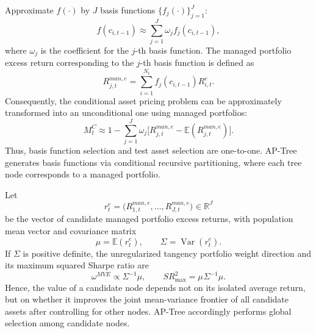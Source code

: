 \documentclass[12pt]{article}
\def\bm#1{#1}%
\def\mathrm#1{#1}%
\def\top{}%
\begin{document}
Approximate \(f(\cdot)\) by \(J\) basis functions \(\{f_j(\cdot)\}_{j=1}^{J}\):
\begin{equation}
  f(\bm c_{i,t-1})
  \approx
  \sum_{j=1}^{J}\omega_j f_j(\bm c_{i,t-1}),
  \label{eq:basis_approximation}
\end{equation}
where \(\omega_j\) is the coefficient for the \(j\)-th basis function. The managed portfolio excess return corresponding to the \(j\)-th basis function is defined as
\begin{equation}
  R_{j,t}^{\mathrm{man},e}
  =
  \sum_{i=1}^{N_t}
  f_j(\bm c_{i,t-1})R_{i,t}^{e}.
  \label{eq:managed_return_general}
\end{equation}
Consequently, the conditional asset pricing problem can be approximately transformed into an unconditional one using managed portfolios:
\begin{equation}
  M_t^{C}
  \approx
  1-\sum_{j=1}^{J}\omega_j
  \bigl[
    R_{j,t}^{\mathrm{man},e}
    -\mathbb E(R_{j,t}^{\mathrm{man},e})
  \bigr].
  \label{eq:unconditional_sdf}
\end{equation}
Thus, basis function selection and test asset selection are one-to-one. AP-Tree generates basis functions via conditional recursive partitioning, where each tree node corresponds to a managed portfolio.

Let
\begin{equation}
  \bm r_t^{e}
  =
  \bigl(
    R_{1,t}^{\mathrm{man},e},\ldots,
    R_{J,t}^{\mathrm{man},e}
  \bigr)^{\top}
  \in\mathbb R^J
  \label{eq:managed_return_vector}
\end{equation}
be the vector of candidate managed portfolio excess returns, with population mean vector and covariance matrix
\begin{equation}
  \bm\mu=\mathbb E(\bm r_t^e),
  \qquad
  \bm\Sigma
  =\operatorname{Var}(\bm r_t^e).
  \label{eq:population_moments}
\end{equation}
If \(\bm\Sigma\) is positive definite, the unregularized tangency portfolio weight direction and its maximum squared Sharpe ratio are
\begin{equation}
  \bm\omega^{\mathrm{MVE}}
  \propto
  \bm\Sigma^{-1}\bm\mu,
  \qquad
  \mathrm{SR}_{\max}^{2}
  =
  \bm\mu^{\top}\bm\Sigma^{-1}\bm\mu.
  \label{eq:tangency_population}
\end{equation}
Hence, the value of a candidate node depends not on its isolated average return, but on whether it improves the joint mean-variance frontier of all candidate assets after controlling for other nodes. AP-Tree accordingly performs global selection among candidate nodes.
\end{document}
